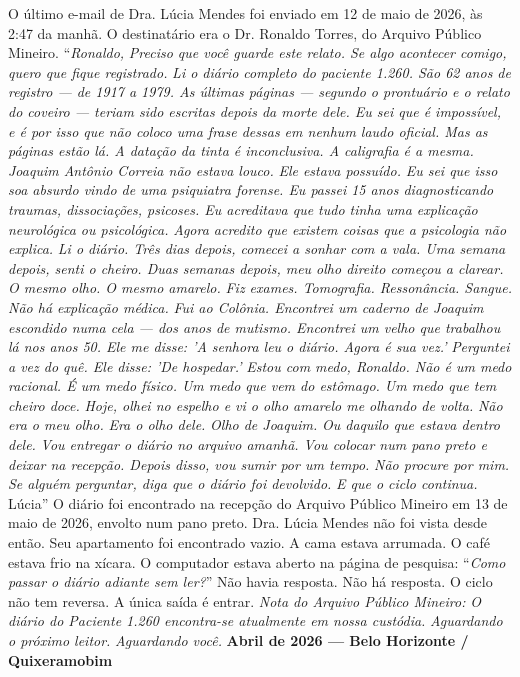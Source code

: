 \noindent O último e-mail de Dra. Lúcia Mendes foi enviado em 12 de maio de 2026, às 2:47 da manhã.
\noindent O destinatário era o Dr. Ronaldo Torres, do Arquivo Público Mineiro.
\noindent \textquotedblleft{\textit{Ronaldo,}}
\noindent \textit{Preciso que você guarde este relato. Se algo acontecer comigo, quero que fique registrado.}
\noindent \textit{Li o diário completo do paciente 1.260. São 62 anos de registro --- de 1917 a 1979. As últimas páginas --- segundo o prontuário e o relato do coveiro --- teriam sido escritas depois da morte dele. Eu sei que é impossível, e é por isso que não coloco uma frase dessas em nenhum laudo oficial. Mas as páginas estão lá. A datação da tinta é inconclusiva. A caligrafia é a mesma.}
\noindent \textit{Joaquim Antônio Correia não estava louco.}
\noindent \textit{Ele estava possuído.}
\noindent \textit{Eu sei que isso soa absurdo vindo de uma psiquiatra forense. Eu passei 15 anos diagnosticando traumas, dissociações, psicoses. Eu acreditava que tudo tinha uma explicação neurológica ou psicológica.}
\noindent \textit{Agora acredito que existem coisas que a psicologia não explica.}
\noindent \textit{Li o diário. Três dias depois, comecei a sonhar com a vala. Uma semana depois, senti o cheiro. Duas semanas depois, meu olho direito começou a clarear.}
\noindent \textit{O mesmo olho. O mesmo amarelo.}
\noindent \textit{Fiz exames. Tomografia. Ressonância. Sangue. Não há explicação médica.}
\noindent \textit{Fui ao Colônia. Encontrei um caderno de Joaquim escondido numa cela --- dos anos de mutismo. Encontrei um velho que trabalhou lá nos anos 50. Ele me disse: 'A senhora leu o diário. Agora é sua vez.'}
\noindent \textit{Perguntei a vez do quê. Ele disse: 'De hospedar.'}
\noindent \textit{Estou com medo, Ronaldo. Não é um medo racional. É um medo físico. Um medo que vem do estômago. Um medo que tem cheiro doce.}
\noindent \textit{Hoje, olhei no espelho e vi o olho amarelo me olhando de volta.}
\noindent \textit{Não era o meu olho.}
\noindent \textit{Era o olho dele.}
\noindent \textit{Olho de Joaquim.}
\noindent \textit{Ou daquilo que estava dentro dele.}
\noindent \textit{Vou entregar o diário no arquivo amanhã. Vou colocar num pano preto e deixar na recepção. Depois disso, vou sumir por um tempo.}
\noindent \textit{Não procure por mim.}
\noindent \textit{Se alguém perguntar, diga que o diário foi devolvido.}
\noindent \textit{E que o ciclo continua.}
\noindent Lúcia\textquotedblright{}
\noindent O diário foi encontrado na recepção do Arquivo Público Mineiro em 13 de maio de 2026, envolto num pano preto.
\noindent Dra. Lúcia Mendes não foi vista desde então.
\noindent Seu apartamento foi encontrado vazio. A cama estava arrumada. O café estava frio na xícara. O computador estava aberto na página de pesquisa: \textquotedblleft{\textit{Como passar o diário adiante sem ler?}\textquotedblright}
\noindent Não havia resposta.
\noindent Não há resposta.
\noindent O ciclo não tem reversa.
\noindent A única saída é entrar.
\noindent \textit{Nota do Arquivo Público Mineiro:}
\noindent \textit{O diário do Paciente 1.260 encontra-se atualmente em nossa custódia.}
\noindent \textit{Aguardando o próximo leitor.}
\noindent \textit{Aguardando você.}
\noindent \textbf{Abril de 2026 --- Belo Horizonte / Quixeramobim}

